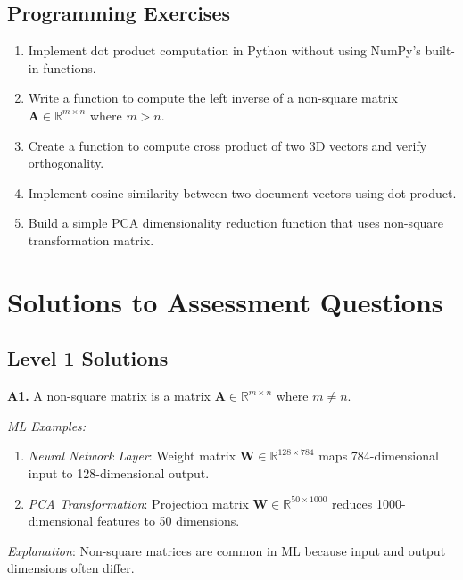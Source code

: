 \documentclass[12pt,a4paper]{article}
\theoremstyle{definition}
\begin{document}
\subsection{Programming Exercises}

\begin{enumerate}[label=\textbf{P\arabic*.}]
\item Implement dot product computation in Python without using NumPy's built-in functions.

\item Write a function to compute the left inverse of a non-square matrix $\mathbf{A} \in \mathbb{R}^{m \times n}$ where $m > n$.

\item Create a function to compute cross product of two 3D vectors and verify orthogonality.

\item Implement cosine similarity between two document vectors using dot product.

\item Build a simple PCA dimensionality reduction function that uses non-square transformation matrix.
\end{enumerate}

\newpage

\section{Solutions to Assessment Questions}

\subsection{Level 1 Solutions}

\textbf{A1.} A non-square matrix is a matrix $\mathbf{A} \in \mathbb{R}^{m \times n}$ where $m \neq n$. 

\textit{ML Examples:}
\begin{enumerate}
\item \textit{Neural Network Layer}: Weight matrix $\mathbf{W} \in \mathbb{R}^{128 \times 784}$ maps 784-dimensional input to 128-dimensional output.
\item \textit{PCA Transformation}: Projection matrix $\mathbf{W} \in \mathbb{R}^{50 \times 1000}$ reduces 1000-dimensional features to 50 dimensions.
\end{enumerate}

\textit{Explanation}: Non-square matrices are common in ML because input and output dimensions often differ.
\end{document}
